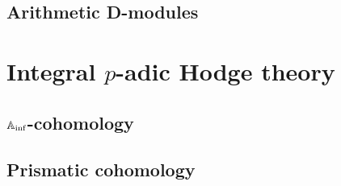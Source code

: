             
            
            
            
        \chapter{Arithmetic D-modules}
            \begin{abstract}
                
            \end{abstract}
            
            \minitoc
            
            
            
            
        
    \part{Integral \texorpdfstring{$p$}{}-adic Hodge theory}
        \chapter{\texorpdfstring{$\mathbb{A}_{\inf}$}{}-cohomology}
            \begin{abstract}
                
            \end{abstract}
            
            \minitoc
    
        \chapter{Prismatic cohomology}
            \begin{abstract}
                
            \end{abstract}
            
            \minitoc
            
            
            
            
            
            
	
	\printbibliography

